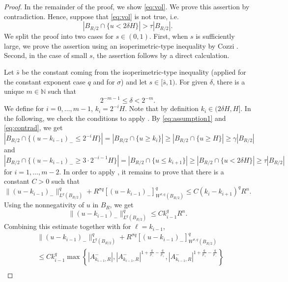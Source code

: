 \documentclass[11pt]{amsart}
\theoremstyle{plain}
\theoremstyle{definition}
\numberwithin{equation}{section}
\newcommand{\N}{\mathbb{N}}
\begin{document}
\begin{proof}
In the remainder of the proof, we show \eqref{eq:vol}. We prove this assertion by contradiction.
Hence, suppose that \eqref{eq:vol} is not true, i.e.
\begin{equation}\label{eq:contrad}
|B_{R/2} \cap \lbrace u < 2\delta H \rbrace| > \tau |B_{R/2}|.
\end{equation} 
We split the proof into two cases for $s\in(0,1)$. First, when $s$ is sufficiently large, we prove the assertion using an isoperimetric-type inequality by Cozzi \cite[Proposition 5.1]{Coz17}. Second, in the case of small $s$, the assertion follows by a direct calculation.

Let $\bar{s}$ be the constant coming from the isoperimetric-type inequality \cite[Proposition 5.1]{Coz17} (applied for the constant exponent case $q$ and for $\sigma$) and let $s\in[\bar{s},1)$. For given $\delta$, there is a unique $m\in\N$ such that
\[ 2^{-m-1}\leq \delta < 2^{-m}. \]
We define for $i = 0,\dots,m-1$, $k_i= 2^{-i}H.$ Note that by definition $k_i\in (2\delta H, H]$.
In the following, we check the conditions to apply \cite[Proposition 5.1]{Coz17}. By \eqref{eq:assumption1} and \eqref{eq:contrad}, we get
\[ |B_{R/2} \cap \lbrace (u-k_{i-1})_{-} \leq 2^{-i}H \rbrace| = |B_{R/2} \cap \lbrace u \geq k_i \rbrace| \geq |B_{R/2} \cap \lbrace u \geq H \rbrace|  \geq \gamma |B_{R/2}|   \]
and
\[ |B_{R/2} \cap \lbrace (u-k_{i-1})_{-} \geq 3\cdot 2^{-i-1}H \rbrace| = |B_{R/2} \cap \lbrace u \leq k_{i+1} \rbrace| \geq |B_{R/2} \cap \lbrace u < 2\delta H \rbrace|  \geq \tau |B_{R/2}|  \]
for $i=1,\dots, m-2$.
In order to apply \cite[Proposition 5.1]{Coz17}, it remains to prove that there is a constant $C>0$ such that
\begin{equation}\label{eq:condisoper}
\|(u-k_{i-1})_{-}\|_{L^q(B_{R/2})}^q + R^{\sigma q} [(u-k_{i-1})_{-}]_{W^{\sigma,q}(B_{R/2})}^q \leq C(k_i-k_{i+1})^q R^n.
\end{equation} 
Using the nonnegativity of $u$ in $B_{R}$, we get 
\[ \|(u-k_{i-1})_{-}\|_{L^q(B_{R/2})}^q \leq C k_{i-1}^q R^n. \]
Combining this estimate together with  for $\ell=k_{i-1}$,
\begin{equation} \label{eq:k-k}
\begin{split}
&\|(u-k_{i-1})_{-}\|_{L^q(B_{R/2})}^q +  R^{\sigma q}[(u-k_{i-1})_{-}]_{W^{\sigma,q}(B_{R/2})}^q \\
&\leq Ck_{i-1}^q \max \left\lbrace |A_{k_{i-1}, R}^-|, |A_{k_{i-1}, R}^-|^{1+\frac{q}{p_-}-\frac{q}{p_+}}, |A_{k_{i-1}, R}^-|^{1+\frac{q}{p_+} - \frac{q}{p_-}} \right\rbrace \\

\end{split}
\end{equation}
\end{proof}
\end{document}
